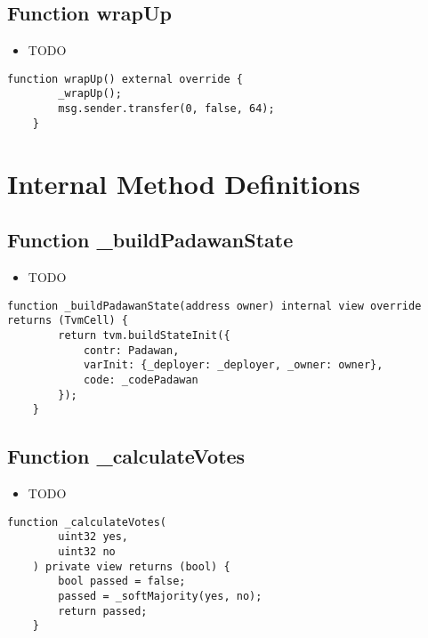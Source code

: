 \subsection{Function wrapUp}

\begin{itemize}
\item TODO
\end{itemize}

\begin{lstlisting}[firstnumber=49]
    function wrapUp() external override {
        _wrapUp();
        msg.sender.transfer(0, false, 64);
    }
\end{lstlisting}

\section{Internal Method Definitions}


\subsection{Function \_{}buildPadawanState}

\begin{itemize}
\item TODO
\end{itemize}

\begin{lstlisting}[firstnumber=154]
    function _buildPadawanState(address owner) internal view override returns (TvmCell) {
        return tvm.buildStateInit({
            contr: Padawan,
            varInit: {_deployer: _deployer, _owner: owner},
            code: _codePadawan
        });
    }
\end{lstlisting}

\subsection{Function \_{}calculateVotes}

\begin{itemize}
\item TODO
\end{itemize}

\begin{lstlisting}[firstnumber=132]
    function _calculateVotes(
        uint32 yes,
        uint32 no
    ) private view returns (bool) {
        bool passed = false;
        passed = _softMajority(yes, no);
        return passed;
    }
\end{lstlisting}

